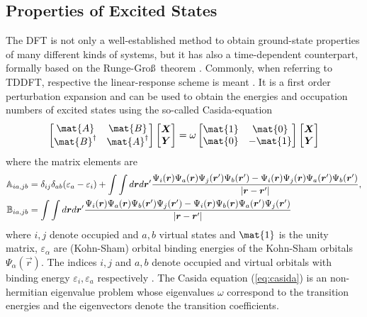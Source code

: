 \subsection{Properties of Excited States}
\label{ch:tddft}
The DFT is not only a well-established method to obtain ground-state properties of many different kinds of systems, but it has also a time-dependent counterpart, formally based on the Runge-Gro\ss\, theorem \cite{RungeGross}.
Commonly, when referring to TDDFT, respective the linear-response scheme is meant \cite{dreuw}.
It is a first order perturbation expansion and can be used to obtain the energies and occupation numbers of excited states using the so-called Casida-equation \cite{casida}
\begin{equation} \label{eq:casida}
\begin{bmatrix} \mat{A} & \mat{B} \\ \mat{B}^\dagger & \mat{A}^\dagger\end{bmatrix}
\begin{bmatrix} \vec{X} \\ \vec{Y} \end{bmatrix} =
\omega \begin{bmatrix} \mat{1} & \mat{0} \\ \mat{0} & -\mat{1}\end{bmatrix}
\begin{bmatrix} \vec{X} \\ \vec{Y} \end{bmatrix}
\end{equation}
where the matrix elements are
\begin{align}
\mathbb{A}_{ia,jb}& =\delta_{ij}\delta_{ab}(\varepsilon_a-\varepsilon_i)+ 
\int \int d\bm{r} d\bm{r}'\frac{ \Psi_i(\bm{r}) \Psi_a(\bm{r})  \Psi_j(\bm{r}') \Psi_b(\bm{r}')- 
\Psi_i(\bm{r}) \Psi_j(\bm{r}) \Psi_a(\bm{r}') \Psi_b(\bm{r}')}{|\bm{r}-\bm{r}'|} ,\\
\mathbb{B}_{ia,jb}& = \int \int d\bm{r} d\bm{r}'\frac{\Psi_i(\bm{r}) \Psi_a(\bm{r})  \Psi_b(\bm{r}') \Psi_j(\bm{r}')- 
\Psi_i(\bm{r}) \Psi_b(\bm{r})  \Psi_a(\bm{r}') \Psi_j(\bm{r}')}{|\bm{r}-\bm{r}'|}
\end{align}
where $i,j$ denote occupied and $a,b$ virtual states and $\mat{1}$ is the unity matrix, $\varepsilon_\alpha$ are (Kohn-Sham) orbital binding energies of the Kohn-Sham orbitals $\Psi_\alpha(\vec{r})$.
The indices $i,j$ and $a,b$ denote occupied and virtual orbitals with binding energy $\varepsilon_i, \varepsilon_a$ respectively \cite{dreuw}.
The Casida equation (\ref{eq:casida}) is an non-hermitian eigenvalue problem whose eigenvalues $\omega$ correspond to the transition energies and the eigenvectors denote the transition coefficients.

